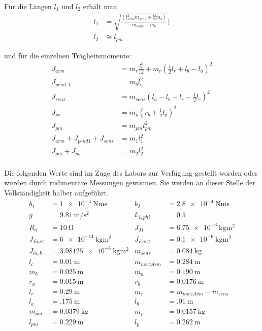 Für die Längen $l_1$ und $l_2$ erhält man
\begin{align*}
l_1 &= \sqrt{\frac{(l_{sens}^2 \dot m_{sens}+l_b^2 \dot m_b)}{m_{sens} + m_b})} \\
l_2 &\cong l_{pm}
\end{align*}

und für die einzelnen Trägheitsmomente:
\begin{align*}
J_{arm} &= m_r \frac{l^2_r}{12}+m_r(\frac{1}{2}l_r+l_b-l_a)^2 \\
J_{pend,1} &= m_bl^2_a \\
J_{sens} &= m_{sens}(l_a-l_b-l_r-\frac{1}{2}l_c)^2 \\
J_{ps} &= m_p(r_b+\frac{1}{2}l_p)^2 \\
J_{pm} &= m_{pm}l^2_{pm} \\
J_{arm}+J_{pend1}+J_{sens} &= m_1l^2_1 \\ 
J_{pm}+J_{ps} &= m_2l^2_2 \\
\end{align*}

Die folgenden Werte sind im Zuge des Labors zur Verfügung gestellt worden oder wurden durch rudimentäre Messungen gewonnen. Sie werden an dieser Stelle der Vollständigkeit halber aufgeführt. 
\begin{align*}
b_1 &= \SI{1e-4}{\newton\metre\second} &
b_2 &= \SI{2.8e-4}{\newton\metre\second} \\
g &= \SI{9.81}{\metre\per\square\second} &
k_{1,phi} &= \SI{0.5}{}\\
R_a &= \SI{10}{\ohm} &
J_M  &=  \SI{6.75e-6}{\kilo\gram\square\metre}  \\        %
J_{Enc1}  &=  \SI{6e-14}{\kilo\gram\square\metre}  &        %
J_{Enc2}  &=  \SI{0.1e-6}{\kilo\gram\square\metre}  \\     %
J_{m,b}  &=  \SI{3.98125e-6}{\kilo\gram\square\metre}  &     %
m_{sens}  &=  \SI{0.084}{\kilo\gram}  \\
l_c  &=  \SI{0.01}{\metre}  &
m_{horzArm} &= \SI{0.284}{\metre} \\
m_b &= \SI{0.025}{\metre}  &
m_a &= \SI{0.190}{\metre} \\
r_a &= \SI{0.015}{\metre}  &
r_b &= \SI{0.0176}{\metre} \\
l_r &= \SI{0.29}{\metre} &
m_r  &=  m_{horzArm} - m_{sens}\\
l_a &= \SI{.175}{\metre} &
l_b &= \SI{.01}{\metre}\\
m_{pm} &= \SI{0.0379}{\kilo\gram} &
m_p &= \SI{0.0157}{\kilo\gram}\\
l_{pm} &= \SI{0.229}{\metre} &
l_p &= \SI{0.262}{\metre}\\
\end{align*}

